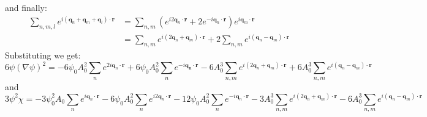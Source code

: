 \documentclass[reqno]{article}
\begin{document}
and finally:
\begin{equation}
    \begin{split}
        \sum_{n, m, l} e^{i \left( \mathbf{q}_n + \mathbf{q}_m + \mathbf{q}_l\right) \cdot \mathbf{r}}
        &=
        \sum_{n, m} \left(e^{i 2 \mathbf{q}_n \cdot \mathbf{r}} + 2 e^{-i \mathbf{q}_n \cdot \mathbf{r}}\right)
        e^{i \mathbf{q}_m \cdot \mathbf{r}} \\
        &=
        \sum_{n, m} e^{i \left(2 \mathbf{q}_n + \mathbf{q}_m \right) \cdot \mathbf{r}}
        + 2 \sum_{n, m} e^{i \left(\mathbf{q}_n - \mathbf{q}_m \right) \cdot \mathbf{r}}
    \end{split}
\end{equation}
Substituting we get:
\begin{equation}
    6 \psi \left(\nabla \psi\right)^2
    =
    -6 \psi_0 A_0^2 \sum_n e^{2 i \mathbf{q}_n \cdot \mathbf{r}}
    + 6 \psi_0 A_0^2 \sum_n e^{- i \mathbf{q_n \cdot \mathbf{r}}}
    - 6 A_0^3 \sum_{n, m} e^{i \left(2 \mathbf{q}_n + \mathbf{q}_m \right) \cdot \mathbf{r}}
    + 6 A_0^3 \sum_{n, m} e^{i \left(\mathbf{q}_n - \mathbf{q}_m \right) \cdot \mathbf{r}}
\end{equation}
and
\begin{equation}
    3 \psi^2 \chi
    =
    -3 \psi_0^2 A_0 \sum_n e^{i \mathbf{q}_n \cdot \mathbf{r}}
    -6 \psi_0 A_0^2 \sum_n e^{i 2 \mathbf{q}_n \cdot \mathbf{r}}
    - 12\psi_0 A_0^2 \sum_n e^{-i \mathbf{q}_n \cdot \mathbf{r}}
    - 3 A_0^3 \sum_{n, m} e^{i \left(2 \mathbf{q}_n + \mathbf{q}_m \right) \cdot \mathbf{r}}
    - 6 A_0^3 \sum_{n, m} e^{i \left(\mathbf{q}_n - \mathbf{q}_m \right) \cdot \mathbf{r}}
\end{equation}
\end{document}
